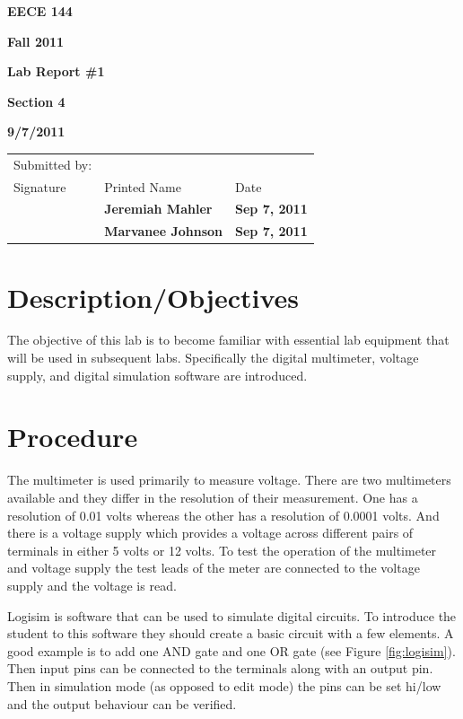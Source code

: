 \documentclass[12pt]{article}
\begin{document}

\centerline{\bf EECE 144}
\centerline{\bf Fall 2011}
\centerline{\bf}
\centerline{\bf Lab Report \#1}
\centerline{\bf Section 4}
\centerline{\bf 9/7/2011}

\begin{center}
\begin{tabularx}{\textwidth}[b]{X l l}
Submitted by: & & \\
Signature & Printed Name & Date \\
\hline
\multicolumn{1}{|X|}{} & \multicolumn{1}{|l|}{\bigstrut \bf Jeremiah Mahler} & \multicolumn{1}{|l|}{\bf Sep 7, 2011} \\
\hline
\multicolumn{1}{|X|}{} & \multicolumn{1}{|l|}{\bigstrut \bf Marvanee Johnson} & \multicolumn{1}{|l|}{\bf Sep 7, 2011} \\
\hline
\end{tabularx}
\end{center}

\section{Description/Objectives}

The objective of this lab is to become familiar with essential
lab equipment that will be used in subsequent labs.
Specifically the digital multimeter, voltage supply, and digital simulation
software are introduced.

\section{Procedure}

The multimeter is used primarily to measure voltage.
There are two multimeters available and they differ in
the resolution of their measurement.
One has a resolution of 0.01 volts whereas the other has a resolution
of 0.0001 volts.
And there is a voltage supply which provides a voltage across
different pairs of terminals in either 5 volts or 12 volts.
To test the operation of the multimeter and voltage supply the test
leads of the meter are connected to the voltage supply and the voltage
is read.

Logisim \cite{LOGISIM} is software that can be used to simulate digital
circuits.
To introduce the student to this software they should create a basic circuit
with a few elements.
A good example is to add one AND gate and one OR gate (see Figure \ref{fig:logisim}).
Then input pins can be connected to the terminals along with an output pin.
Then in simulation mode (as opposed to edit mode) the pins can be set hi/low
and the output behaviour can be verified.
\end{document}
